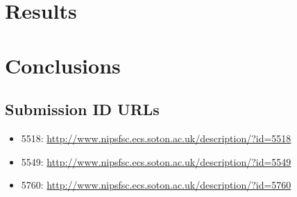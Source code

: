 \documentclass{ecsarticle}     %
\begin{document}
\section{Results}

\section{Conclusions}


\newpage






\backmatter
\begin{appendix}

\newpage


\section{Submission ID URLs}
\label{sec:id}
\begin{itemize}
	\item 5518: \href{http://www.nipsfsc.ecs.soton.ac.uk/description/?id=5518}{http://www.nipsfsc.ecs.soton.ac.uk/description/?id=5518}
	\item 5549: \href{http://www.nipsfsc.ecs.soton.ac.uk/description/?id=5549}{http://www.nipsfsc.ecs.soton.ac.uk/description/?id=5549}
	\item 5760: \href{http://www.nipsfsc.ecs.soton.ac.uk/description/?id=5760}{http://www.nipsfsc.ecs.soton.ac.uk/description/?id=5760}
\end{itemize}





\end{appendix}
\end{document}
